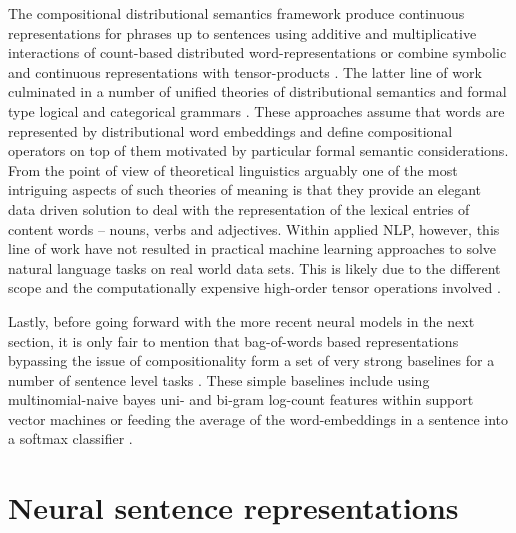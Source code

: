 The compositional distributional semantics  framework  produce
continuous representations for phrases up to sentences using additive and multiplicative interactions
of count-based distributed word-representations \citep{mitchell2008vector} or combine symbolic and
continuous representations with tensor-products \citep{clark2007combining}.
The latter line of work culminated in a number of unified theories of
distributional semantics and formal type logical and categorical grammars
\citep{coecke2010mathematical,clarke2012context,baroni2014frege}.
These approaches assume that words are represented by distributional word embeddings
and define compositional operators on top of them motivated by particular formal
semantic considerations. From the point of view of theoretical linguistics arguably
one of the most intriguing aspects of such theories of meaning is that
they provide an elegant data driven solution to deal with the representation of the lexical entries of
content words -- nouns, verbs and adjectives.
Within applied NLP, however, this line of work have not resulted in
practical machine learning approaches to solve natural language tasks
on real world data sets. This is likely due to the different scope and
the computationally expensive high-order
tensor operations involved \citep{bowman2016modeling}.

Lastly, before going forward with the more recent neural models in the next section,
it is only fair to mention that bag-of-words
based representations bypassing the issue of compositionality form a set of very strong baselines
for a number of sentence level tasks \citep{hill2016learning}.
These simple baselines include using multinomial-naive bayes uni- and bi-gram
log-count features within support vector machines \citep{wang2012baselines} or
feeding the average of the word-embeddings in a sentence into a softmax classifier \citep{joulin2016bag}.


\section{Neural sentence representations}
\label{sec:trans-sentence}


